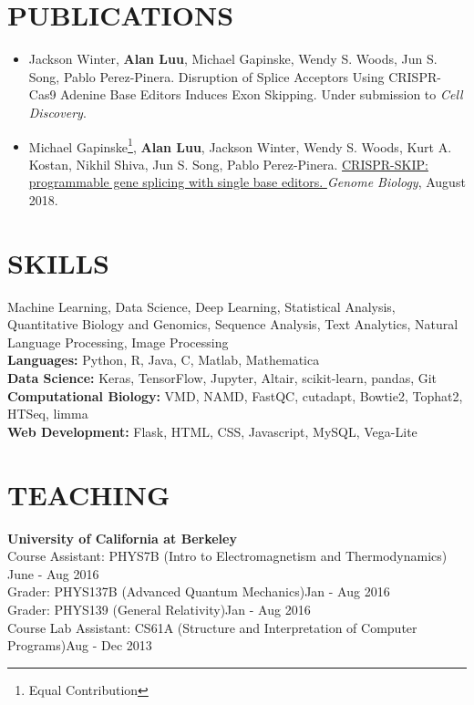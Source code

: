 \documentclass{res}
\begin{document}
\begin{resume}
\begin{itemize}
\end{itemize}
\newpage
\section{PUBLICATIONS}
\begin{itemize}[leftmargin=0in,label={}]
\item Jackson Winter, \textbf{Alan Luu}, Michael Gapinske, Wendy S. Woods,
Jun S. Song, Pablo Perez-Pinera. Disruption of Splice Acceptors Using CRISPR-Cas9 Adenine Base Editors Induces Exon Skipping. Under submission to \textit{Cell Discovery}.
\item Michael Gapinske\footnote{Equal Contribution}, \textbf{Alan Luu}\footnotemark[1], Jackson Winter, Wendy S. Woods, Kurt A. Kostan, Nikhil Shiva, Jun S. Song, Pablo Perez-Pinera. \href{https://www.ncbi.nlm.nih.gov/pmc/articles/PMC6092781/}{CRISPR-SKIP: programmable gene splicing with single base editors.
} \textit{Genome Biology}, August 2018.
\end{itemize}
\vspace{-10pt}
\section{SKILLS}
Machine Learning, Data Science, Deep Learning, Statistical Analysis, Quantitative Biology and Genomics, Sequence Analysis, Text Analytics, Natural Language Processing, Image Processing %
\\ \textbf{Languages:} Python, R, Java, C, Matlab, Mathematica
\\ \textbf{Data Science:} Keras, TensorFlow, Jupyter, Altair, scikit-learn, pandas, Git
\\ \textbf{Computational Biology:} VMD, NAMD, FastQC, cutadapt, Bowtie2, Tophat2, HTSeq, limma
\\ \textbf{Web Development:} Flask, HTML, CSS, Javascript, MySQL, Vega-Lite
\vspace{-10pt}
\section{TEACHING}
   \textbf{University of California at Berkeley}
   \\Course Assistant: PHYS7B (Intro to Electromagnetism and Thermodynamics) \hfill June - Aug 2016
   \\Grader: PHYS137B (Advanced Quantum Mechanics)\hfill Jan - Aug 2016
   \\Grader: PHYS139 (General Relativity)\hfill Jan - Aug 2016
   \\Course Lab Assistant: CS61A (Structure and Interpretation of Computer Programs)\hfill Aug - Dec 2013
\vspace{-10pt}

\end{resume}
\end{document}
